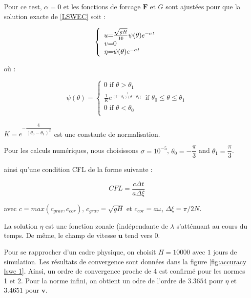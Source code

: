 Pour ce test, $\alpha = 0$ et les fonctions de forcage $\mathbf{F}$ et $G$ sont ajustées pour que la solution exacte de \eqref{LSWEC} soit :

\begin{equation}
\left\lbrace
\begin{array}{r @{=} l}
u & \frac{\sqrt{gH}}{10} \psi ( \theta )  e^{-\sigma t} \\
v & 0 \\
\eta & \psi( \theta ) e^{-\sigma t}
\end{array}
\right.
\end{equation}

où :

\begin{equation*}
\psi ( \theta ) = 
\left\lbrace
\begin{array}{l}
0 \text{ if } \theta > \theta_1\\
\frac{1}{K}e^{\frac{1}{(\theta - \theta_0)(\theta-\theta_1)}} \text{ if } \theta_0 \leq \theta \leq \theta_1 \\
0 \text{ if } \theta < \theta_0\\
 
\end{array}
\right.
\label{galewski_fun}
\end{equation*}

$K = e^{-\dfrac{4}{(\theta_0 - \theta_1)^2}}$ est une constante de normalisation.

Pour les calculs numériques, nous choisissons $\sigma = 10^{-5}$, $\theta_0 = -\dfrac{\pi}{3}$ and $\theta_1 = \dfrac{\pi}{3}$.

ainsi qu'une condition CFL de la forme suivante :

\begin{equation}
CFL = \dfrac{c \Delta t}{a \Delta \xi}
\end{equation}

avec $c = max(c_{grav}, c_{cor})$, $c_{grav} = \sqrt{gH}$ et $c_{cor} = a \omega$, $\Delta \xi = \pi / 2N$.

La solution $\eta$ est une fonction zonale (indépendante de $\lambda$ s'atténuant au cours du temps. De même, le champ de vitesse $\mathbf{u}$ tend vers $0$.

Pour se rapprocher d'un cadre physique, on choisit $H=10000$ avec $1$ jours de simulation. Les résultats de convergence sont données dans la figure \ref{fig:accuracy lswe 1}. Ainsi, un ordre de convergence proche de 4 est confirmé pour les normes 1 et 2. Pour la norme infini, on obtient un odre de l'ordre de $3.3654$ pour $\eta$ et $3.4651$ pour $\mathbf{v}$.


